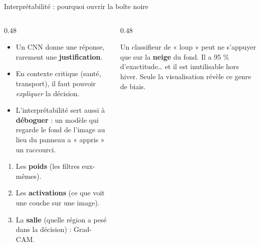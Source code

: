 
\begin{frame}{Interprétabilité : pourquoi ouvrir la boîte noire}
\begin{columns}[t]
\begin{column}{0.48\textwidth}
\begin{itemize}
  \item Un CNN donne une réponse, rarement une \textbf{justification}.
  \item En contexte critique (santé, transport), il faut pouvoir
  \emph{expliquer} la décision.
  \item L'interprétabilité sert aussi à \textbf{déboguer} : un modèle qui regarde
  le fond de l'image au lieu du panneau a « appris » un raccourci.
\end{itemize}
\begin{kbox}
\begin{enumerate}
  \item Les \textbf{poids} (les filtres eux-mêmes).
  \item Les \textbf{activations} (ce que voit une couche sur une image).
  \item La \textbf{salle} (quelle région a pesé dans la décision) : Grad-CAM.
\end{enumerate}
\end{kbox}
\end{column}
\begin{column}{0.48\textwidth}
\begin{wbox}
Un classifieur de « loup » peut ne s'appuyer que sur la \textbf{neige} du fond.
Il a 95 \% d'exactitude\dots{} et il est inutilisable hors hiver.
Seule la visualisation révèle ce genre de biais.
\end{wbox}
\end{column}
\end{columns}
\end{frame}

